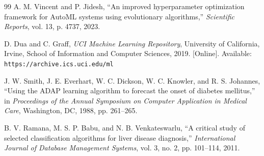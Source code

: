 \documentclass[letterpaper, 10 pt, conference]{ieeeconf}
\begin{document}
\begin{thebibliography}{99}
	 A. M. Vincent and P. Jidesh, ``An improved hyperparameter optimization framework for AutoML systems using evolutionary algorithms,'' \emph{Scientific Reports}, vol. 13, p. 4737, 2023.

	 D. Dua and C. Graff, \emph{UCI Machine Learning Repository}, University of California, Irvine, School of Information and Computer Sciences, 2019. [Online]. Available: \texttt{https://archive.ics.uci.edu/ml}

	 J. W. Smith, J. E. Everhart, W. C. Dickson, W. C. Knowler, and R. S. Johannes, ``Using the ADAP learning algorithm to forecast the onset of diabetes mellitus,'' in \emph{Proceedings of the Annual Symposium on Computer Application in Medical Care}, Washington, DC, 1988, pp. 261--265.

	 B. V. Ramana, M. S. P. Babu, and N. B. Venkateswarlu, ``A critical study of selected classification algorithms for liver disease diagnosis,'' \emph{International Journal of Database Management Systems}, vol. 3, no. 2, pp. 101--114, 2011.

\end{thebibliography}
\end{document}
